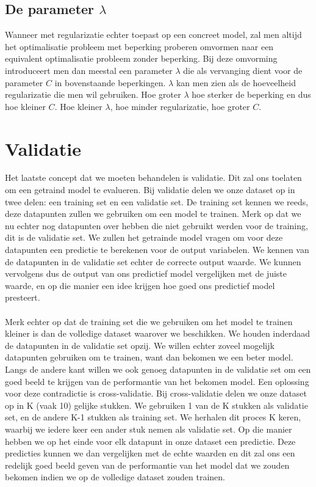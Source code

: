 \subsection{De parameter $\lambda$}
Wanneer met regularizatie echter toepast op een concreet model, zal men altijd het optimalisatie probleem met beperking proberen omvormen naar een equivalent optimalisatie probleem zonder beperking. Bij deze omvorming introduceert men dan meestal een parameter $\lambda$ die als vervanging dient voor de parameter $C$ in bovenstaande beperkingen. $\lambda$ kan men zien als de hoeveelheid regularizatie die men wil gebruiken. Hoe groter $\lambda$ hoe sterker de beperking en dus hoe kleiner $C$. Hoe kleiner $\lambda$, hoe minder regularizatie, hoe groter $C$.

\section{Validatie}
Het laatste concept dat we moeten behandelen is validatie. Dit zal ons toelaten om een getraind model te evalueren. Bij validatie delen we onze dataset op in twee delen: een training set en een validatie set. De training set kennen we reeds, deze datapunten zullen we gebruiken om een model te trainen. Merk op dat we nu echter nog datapunten over hebben die niet gebruikt werden voor de training, dit is de validatie set. We zullen het getrainde model vragen om voor deze datapunten een predictie te berekenen voor de output variabelen. We kennen van de datapunten in de validatie set echter de correcte output waarde. We kunnen vervolgens dus de output van ons predictief model vergelijken met de juiste waarde, en op die manier een idee krijgen hoe goed ons predictief model presteert. \\ \\
Merk echter op dat de training set die we gebruiken om het model te trainen kleiner is dan de volledige dataset waarover we beschikken. We houden inderdaad de datapunten in de validatie set opzij. We willen echter zoveel mogelijk datapunten gebruiken om te trainen, want dan bekomen we een beter model. Langs de andere kant willen we ook genoeg datapunten in de validatie set om een goed beeld te krijgen van de performantie van het bekomen model. Een oplossing voor deze contradictie is cross-validatie. Bij cross-validatie delen we onze dataset op in K (vaak 10) gelijke stukken. We gebruiken 1 van de K stukken als validatie set, en de andere K-1 stukken als training set. We herhalen dit proces K keren, waarbij we iedere keer een ander stuk nemen als validatie set. Op die manier hebben we op het einde voor elk datapunt in onze dataset een predictie. Deze predicties kunnen we dan vergelijken met de echte waarden en dit zal ons een redelijk goed beeld geven van de performantie van het model dat we zouden bekomen indien we op de volledige dataset zouden trainen.
